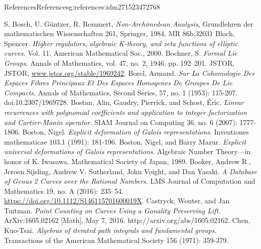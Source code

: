\documentclass[oneside,10pt,]{book}
\numberwithin{equation}{section}
\begin{document}
\begin{references-chapter-numberless}{References}{}{References}{}{}{g:references:idm271523472768}
\begin{thebibliography}{9}
\hypertarget{x:biblio:bib-bgr}{}S. Bosch, U. Güntzer, R. Remmert, \textit{Non-Archimedean Analysis}, Grundlehren der mathematischen Wissenschaften 261, Springer, 1984. MR 86b:32031
\hypertarget{x:biblio:bib-bloch}{}Bloch, Spencer.  \textit{Higher regulators, algebraic K-theory, and zeta functions of elliptic curves.} Vol. 11. American Mathematical Soc., 2000.
\hypertarget{x:biblio:bib-bochner-formal}{}Bochner, S. \textit{Formal Lie Groups}. Annals of Mathematics, vol. 47, no. 2, 1946, pp. 192–201. JSTOR, JSTOR, \url{www.jstor.org/stable/1969242}.
\hypertarget{x:biblio:bib-borel-hopf}{}Borel, Armand. \textit{Sur La Cohomologie Des Espaces Fibres Principaux Et Des Espaces Homogenes De Groupes De Lie Compacts}. Annals of Mathematics, Second Series, 57, no. 1 (1953): 115-207. doi:10.2307\slash{}1969728.
\hypertarget{x:biblio:bib-bostan-gaudry-schost}{}Bostan, Alin, Gaudry, Pierrick, and Schost, Éric. \textit{Linear recurrences with polynomial coefficients and application to integer factorization and Cartier-Manin operator}. SIAM Journal on Computing 36, no. 6 (2007): 1777-1806.
\hypertarget{x:biblio:bib-boston-explicit}{}Boston, Nigel. \textit{Explicit deformation of Galois representations}. Inventiones mathematicae 103.1 (1991): 181-196.
\hypertarget{x:biblio:bib-boston-mazur}{}Boston, Nigel, and Barry Mazur. \textit{Explicit universal deformations of Galois representations}. Algebraic Number Theory—in honor of K. Iwasawa. Mathematical Society of Japan, 1989.
\hypertarget{x:biblio:bib-booker-database-genus-2}{}Booker, Andrew R., Jeroen Sijsling, Andrew V. Sutherland, John Voight, and Dan Yasaki. \textit{A Database of Genus 2 Curves over the Rational Numbers}. LMS Journal of Computation and Mathematics 19, no. A (2016): 235–54. \url{https://doi.org/10.1112/S146115701600019X}.
\hypertarget{x:biblio:bib-castryck-tuitman}{}Castryck, Wouter, and Jan Tuitman. \textit{Point Counting on Curves Using a Gonality Preserving Lift}. ArXiv:1605.02162 [Math], May 7, 2016. http:\slash{}\slash{}arxiv.org\slash{}abs\slash{}1605.02162.
\hypertarget{x:biblio:bib-chen}{}Chen, Kuo-Tsai.  \textit{Algebras of iterated path integrals and fundamental groups.} Transactions of the American Mathematical Society 156 (1971): 359-379.

\end{thebibliography}
\end{references-chapter-numberless}
\end{document}
